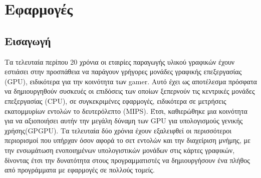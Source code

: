 \chapter{Εφαρμογές}
\section{Εισαγωγή}
Τα τελευταία περίπου 20 χρόνια οι εταιρίες παραγωγής υλικού γραφικών έχουν εστιάσει στην προσπάθεια να παράγουν γρήγορες μονάδες γραφικής επεξεργασίας (GPU), ειδικότερα για την κοινότητα των gamer. Αυτό έχει ως αποτέλεσμα πρόσφατα να δημιουργηθούν συσκευές οι επιδόσεις των οποίων ξεπερνούν τις κεντρικές μονάδες επεξεργασίας (CPU), σε συγκεκριμένες εφαρμογές, ειδικότερα σε μετρήσεις εκατομμυρίων εντολών το δευτερόλεπτο (MIPS). Έτσι, καθιερώθηκε μια κοινότητα για να αξιοποιήσει αυτήν την μεγάλη δύναμη των GPU για υπολογισμούς γενικής χρήσης(GPGPU). Τα τελευταία δύο χρόνια έχουν εξαλειφθεί οι περισσότεροι περιορισμοί που υπήρχαν όσον αφορά το σετ εντολών και την διαχείριση μνήμης, με την ενσωμάτωση ενοποιημένων υπολογιστικών μονάδων στις κάρτες γραφικών, δίνοντας έτσι την δυνατότητα στους προγραμματιστές να δημιουργήσουν ένα πλήθος από προγράμματα με εφαρμογές σε πολλούς τομείς.






